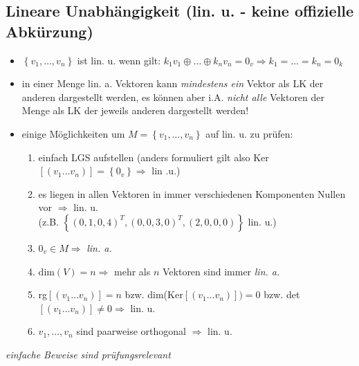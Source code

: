 \documentclass[10pt,a4paper]{article}
\begin{document}
\subsection{Lineare Unabhängigkeit (lin. u. - keine offizielle Abkürzung)}
\begin{itemize}
\item $\left\lbrace v_{1}, \dotsc, v_{n} \right\rbrace$ ist lin. u. wenn gilt: $k_{1}v_{1} \oplus \dotsc \oplus k_{n}v_{n}=0_{v} \Rightarrow k_{1}=\dotsc=k_{n}=0_{k}$ 
\item in einer Menge lin. a. Vektoren kann \textit{mindestens ein} Vektor als LK der anderen dargestellt werden, es können aber i.A. \textit{nicht alle} Vektoren der Menge als LK der jeweils anderen dargestellt werden!
\item einige Möglichkeiten um $M=\left\lbrace v_{1}, \dotsc, v_{n}\right\rbrace$ auf lin. u. zu prüfen:
\begin{enumerate}
\item einfach LGS aufstellen (anders formuliert gilt also Ker$[(v_{1} \dotsc v_{n})]=\left\lbrace 0_{v} \right\rbrace \Rightarrow$ lin .u.)
\item es liegen in allen Vektoren in immer verschiedenen Komponenten Nullen vor $\Rightarrow$ lin. u.\\ (z.B. $\left\lbrace(0,1,0,4)^{T},(0,0,3,0)^{T},(2,0,0,0)\right\rbrace$ lin. u.) 
\item $0_{v} \in M \Rightarrow$ \textit{lin. a.}
\item  dim$(V)=n \Rightarrow$ mehr als $n$ Vektoren sind immer \textit{lin. a.}
\item rg$[(v_{1} \dotsc v_{n})]=n$ bzw. dim(Ker$[(v_{1} \dotsc v_{n})])=0$ bzw. det$[(v_{1} \dotsc v_{n})]\neq 0 \Rightarrow$ lin. u. 
\item $v_{1},\dotsc, v_{n}$ sind paarweise orthogonal $\Rightarrow$ lin. u.
\end{enumerate}

\end{itemize}
\textit{einfache Beweise sind prüfungsrelevant}
\end{document}
